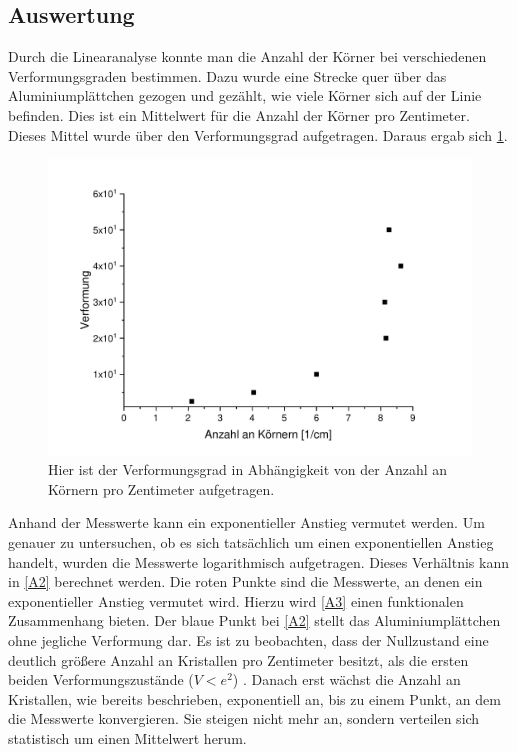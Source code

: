 \documentclass[
	a4paper,
	12pt,
	pagesize,
	ngerman
]{scrartcl}
\begin{document}
\subsection{Auswertung}
Durch die Linearanalyse konnte man die Anzahl der Körner bei verschiedenen Verformungsgraden bestimmen. Dazu wurde eine Strecke quer über das Aluminiumplättchen gezogen und gezählt, wie viele Körner sich auf der Linie befinden. Dies ist ein Mittelwert für die Anzahl der Körner pro Zentimeter. 
Dieses Mittel wurde über den Verformungsgrad aufgetragen.
Daraus ergab sich \cref{A1}.
\begin{figure}[h!]
    \centering
    \includegraphics[scale = 0.6]{A1.pdf}
    \caption{Hier ist der Verformungsgrad in Abhängigkeit von der Anzahl an Körnern pro Zentimeter aufgetragen.}
    \label{A1}
\end{figure}
Anhand der Messwerte kann ein exponentieller Anstieg vermutet werden. Um genauer zu untersuchen, ob es sich tatsächlich um einen exponentiellen Anstieg handelt, wurden die Messwerte logarithmisch aufgetragen. Dieses Verhältnis kann in \cref{A2} berechnet werden. Die roten Punkte sind die Messwerte, an denen ein exponentieller Anstieg vermutet wird. Hierzu wird \cref{A3} einen funktionalen Zusammenhang bieten. Der blaue Punkt bei \cref{A2} stellt das Aluminiumplättchen ohne jegliche Verformung dar. Es ist zu beobachten, dass der Nullzustand eine deutlich größere Anzahl an Kristallen pro Zentimeter besitzt, als die ersten beiden Verformungszustände ($V<e^2$) . Danach erst wächst die Anzahl an Kristallen, wie bereits beschrieben, exponentiell an, bis zu einem Punkt, an dem die Messwerte konvergieren. Sie steigen nicht mehr an, sondern verteilen sich statistisch um einen Mittelwert herum.
\end{document}
